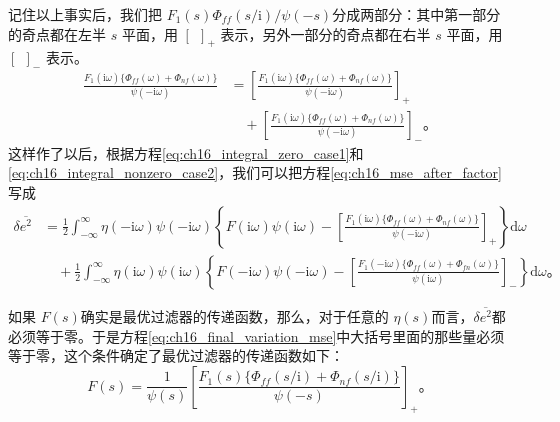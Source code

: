 记住以上事实后，我们把 $F_1(s)\Phi_{ff}(s/\mathrm{i})/\psi(-s)$分成两部分：其中第一部分的奇点都在左半 $s$ 平面，用 $[\ \ ]_+$ 表示，另外一部分的奇点都在右半 $s$ 平面，用 $[\ \ ]_-$ 表示。
\begin{equation}
\begin{aligned}
\frac{F_1(\mathrm{i}\omega)\bigl\{\Phi_{ff}(\omega)+\Phi_{nf}(\omega)\bigr\}}{\psi(-\mathrm{i}\omega)} &= \left[\frac{F_1(\mathrm{i}\omega)\bigl\{\Phi_{ff}(\omega)+\Phi_{nf}(\omega)\bigr\}}{\psi(-\mathrm{i}\omega)}\right]_+ \\
&\quad +\left[\frac{F_1(\mathrm{i}\omega)\bigl\{\Phi_{ff}(\omega)+\Phi_{nf}(\omega)\bigr\}}{\psi(-\mathrm{i}\omega)}\right]_-。
\end{aligned}
\label{eq:ch16_split_spectrum_term}
\end{equation}
这样作了以后，根据方程\eqref{eq:ch16_integral_zero_case1}和\eqref{eq:ch16_integral_nonzero_case2}，我们可以把方程\eqref{eq:ch16_mse_after_factor}写成
\begin{equation}
\begin{aligned}
\delta\overline{e^2} &= \frac12\int_{-\infty}^{\infty}\eta(-\mathrm{i}\omega)\psi(-\mathrm{i}\omega)\left\{F(\mathrm{i}\omega)\psi(\mathrm{i}\omega)-\left[\frac{F_1(\mathrm{i}\omega)\bigl\{\Phi_{ff}(\omega)+\Phi_{nf}(\omega)\bigr\}}{\psi(-\mathrm{i}\omega)}\right]_+\right\}\mathrm{d}\omega \\
&\quad +\frac12\int_{-\infty}^{\infty}\eta(\mathrm{i}\omega)\psi(\mathrm{i}\omega)\left\{F(-\mathrm{i}\omega)\psi(-\mathrm{i}\omega)-\left[\frac{F_1(-\mathrm{i}\omega)\bigl\{\Phi_{ff}(\omega)+\Phi_{fn}(\omega)\bigr\}}{\psi(\mathrm{i}\omega)}\right]_-\right\}\mathrm{d}\omega。
\end{aligned}
\label{eq:ch16_final_variation_mse}
\end{equation}

如果 $F(s)$确实是最优过滤器的传递函数，那么，对于任意的 $\eta(s)$而言，$\delta\overline{e^2}$都必须等于零。于是方程\eqref{eq:ch16_final_variation_mse}中大括号里面的那些量必须等于零，这个条件确定了最优过滤器的传递函数如下：
\begin{equation}
F(s)=\frac{1}{\psi(s)}\left[\frac{F_1(s)\bigl\{\Phi_{ff}(s/\mathrm{i})+\Phi_{nf}(s/\mathrm{i})\bigr\}}{\psi(-s)}\right]_+。
\label{eq:ch16_wiener_hopf_solution}
\end{equation}

